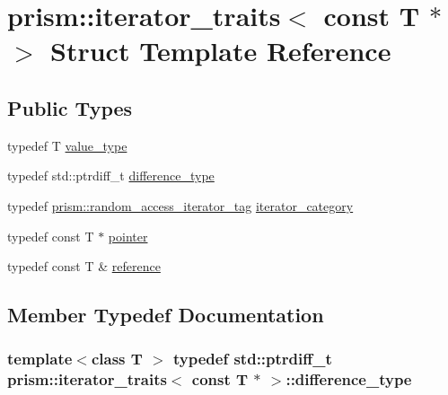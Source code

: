 \hypertarget{structprism_1_1iterator__traits_3_01const_01_t_01_5_01_4}{}\section{prism\+:\+:iterator\+\_\+traits$<$ const T $\ast$ $>$ Struct Template Reference}
\label{structprism_1_1iterator__traits_3_01const_01_t_01_5_01_4}
\subsection*{Public Types}
\begin{DoxyCompactItemize}
\item 
typedef T \hyperlink{structprism_1_1iterator__traits_3_01const_01_t_01_5_01_4_a0c805774795fde0ece3dd34a8583740b}{value\+\_\+type}
\item 
typedef std\+::ptrdiff\+\_\+t \hyperlink{structprism_1_1iterator__traits_3_01const_01_t_01_5_01_4_afcb085f530f9ca126cab191867f578b7}{difference\+\_\+type}
\item 
typedef \hyperlink{structprism_1_1random__access__iterator__tag}{prism\+::random\+\_\+access\+\_\+iterator\+\_\+tag} \hyperlink{structprism_1_1iterator__traits_3_01const_01_t_01_5_01_4_a061fcd33f78e06542543becbc9dbebba}{iterator\+\_\+category}
\item 
typedef const T $\ast$ \hyperlink{structprism_1_1iterator__traits_3_01const_01_t_01_5_01_4_a311fcece25b4ccff83c3d6adc1985643}{pointer}
\item 
typedef const T \& \hyperlink{structprism_1_1iterator__traits_3_01const_01_t_01_5_01_4_ab021c97edb3c26a369607875c59cd0cc}{reference}
\end{DoxyCompactItemize}


\subsection{Member Typedef Documentation}
\subsubsection[{\texorpdfstring{difference\+\_\+type}{difference_type}}]{\setlength{\rightskip}{0pt plus 5cm}template$<$class T $>$ typedef std\+::ptrdiff\+\_\+t {\bf prism\+::iterator\+\_\+traits}$<$ const T $\ast$ $>$\+::{\bf difference\+\_\+type}}\hypertarget{structprism_1_1iterator__traits_3_01const_01_t_01_5_01_4_afcb085f530f9ca126cab191867f578b7}{}\label{structprism_1_1iterator__traits_3_01const_01_t_01_5_01_4_afcb085f530f9ca126cab191867f578b7}
